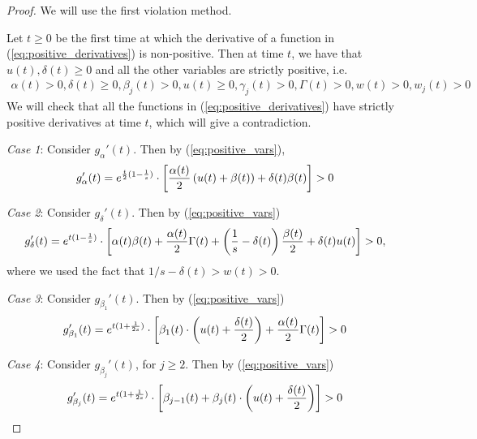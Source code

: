 \documentclass[a4paper,12pt]{article}
\begin{document}
\begin{proof}
We will use the first violation method.

Let $t \geq 0$ be the first time at which the derivative of a function in (\ref{eq:positive_derivatives}) is non-positive. Then at time $t$, we have that $u(t),\delta(t) \geq 0$ and all the other variables are strictly positive, i.e.
\begin{align}  \label{eq:positive_vars}
\alpha(t) > 0, \delta(t) \geq 0, \beta_j(t) > 0, u(t) \geq 0, \gamma_j(t) > 0, \Gamma(t) > 0, w(t) > 0, w_j(t)>0
\end{align}
We will check that all the functions in (\ref{eq:positive_derivatives}) have strictly positive derivatives at time $t$, which will give a contradiction.

\medskip

\noindent \emph{Case 1}: Consider $g_{\alpha}'(t)$. Then by (\ref{eq:positive_vars}),
\begin{align}
g_{\alpha}'(t) & = e^{\frac{t}{2}(1 - \frac{1}{s})} \cdot \left[ \frac{\alpha(t)}{2} \left( u(t) + \beta(t)\right) + \delta(t) \beta(t) \right] > 0\notag
\end{align}

\medskip

\noindent \emph{Case 2}: Consider $g_{\delta}'(t)$. Then by (\ref{eq:positive_vars})
\begin{align}
g_{\delta}'(t) & = e^{t(1-\frac{1}{s})} \cdot \left[\alpha(t) \beta(t) + \frac{\alpha(t)}{2} \Gamma(t) + \left(\frac{1}{s} - \delta(t)\right) \frac{\beta(t)}{2} + \delta(t)u(t) \right] > 0, \notag
\end{align}
where we used the fact that
 $1/s - \delta(t)> w(t)> 0$.

\medskip

\noindent \emph{Case 3}: Consider $g_{\beta_1}'(t)$. Then by (\ref{eq:positive_vars})
\begin{align}
g_{\beta_1}'(t) & = e^{t(1+\frac{1}{2s})} \cdot \left[ \beta_1(t) \cdot \left(u(t) + \frac{\delta(t)}{2} \right) + \frac{\alpha(t)}{2} \Gamma(t) \right] > 0 \notag
\end{align}

\medskip

\noindent \emph{Case 4}: Consider $g_{\beta_j}'(t)$, for $j \geq 2$. Then by (\ref{eq:positive_vars})
\begin{align}
g_{\beta_j}'(t) & = e^{t(1+\frac{1}{2s})} \cdot \left[ \beta_{j-1}(t) + \beta_j(t) \cdot \left(u(t) + \frac{\delta(t)}{2} \right) \right] > 0\notag
\end{align}


\end{proof}
\end{document}
